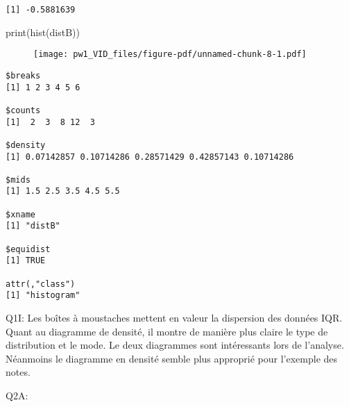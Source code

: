 \documentclass[
  letterpaper,
  DIV=11,
  numbers=noendperiod]{scrartcl}
\newenvironment{Shaded}{}{}
\newcommand{\FunctionTok}[1]{\textcolor[rgb]{0.44,0.26,0.76}{#1}}
\newcommand{\NormalTok}[1]{\textcolor[rgb]{0.14,0.16,0.18}{#1}}
\newcommand{\OtherTok}[1]{\textcolor[rgb]{0.44,0.26,0.76}{#1}}
\newcommand{\SpecialCharTok}[1]{\textcolor[rgb]{0.00,0.36,0.77}{#1}}
\newcommand{\StringTok}[1]{\textcolor[rgb]{0.01,0.18,0.38}{#1}}
\begin{document}
\begin{Shaded}
\end{Shaded}

\begin{verbatim}
[1] -0.5881639
\end{verbatim}

\begin{Shaded}
\begin{Highlighting}[]
\FunctionTok{print}\NormalTok{(}\FunctionTok{hist}\NormalTok{(distB))}
\end{Highlighting}
\end{Shaded}

\begin{figure}[H]

{\centering \texttt{[image: pw1\_VID\_files/figure-pdf/unnamed-chunk-8-1.pdf]}

}

\end{figure}

\begin{verbatim}
$breaks
[1] 1 2 3 4 5 6

$counts
[1]  2  3  8 12  3

$density
[1] 0.07142857 0.10714286 0.28571429 0.42857143 0.10714286

$mids
[1] 1.5 2.5 3.5 4.5 5.5

$xname
[1] "distB"

$equidist
[1] TRUE

attr(,"class")
[1] "histogram"
\end{verbatim}

Q1I: Les boîtes à moustaches mettent en valeur la dispersion des données
IQR. Quant au diagramme de densité, il montre de manière plus claire le
type de distribution et le mode. Le deux diagrammes sont intéressants
lors de l'analyse. Néanmoins le diagramme en densité semble plus
approprié pour l'exemple des notes.

Q2A:
\end{document}
